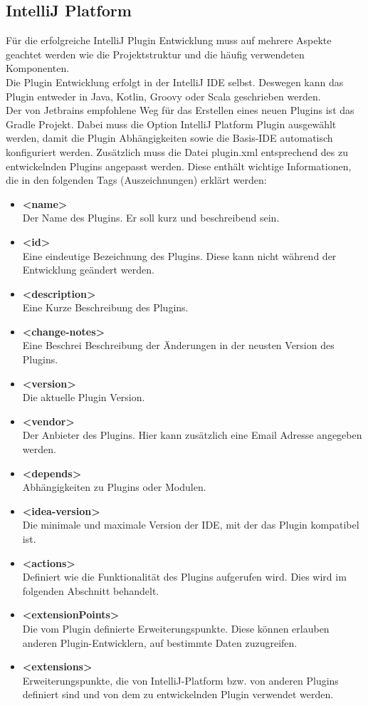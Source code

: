 \subsection{IntelliJ Platform}
	Für die erfolgreiche IntelliJ Plugin Entwicklung muss auf mehrere Aspekte geachtet werden wie die Projektstruktur und die häufig verwendeten Komponenten.\\
	Die Plugin Entwicklung erfolgt in der IntelliJ IDE selbst. Deswegen kann das Plugin entweder in Java, Kotlin, Groovy oder Scala geschrieben werden.\\
	Der von Jetbrains empfohlene Weg für das Erstellen eines neuen Plugins ist das Gradle Projekt. Dabei muss die Option IntelliJ Platform Plugin ausgewählt werden, damit die Plugin Abhängigkeiten sowie die Basis-IDE automatisch konfiguriert werden. Zusätzlich muss die Datei plugin.xml entsprechend des zu entwickelnden Plugins angepasst werden. Diese enthält wichtige Informationen, die in den folgenden Tags (Auszeichnungen) erklärt werden:
	\begin{itemize}
		\item \textbf{<name>} \\
		Der Name des Plugins. Er soll kurz und beschreibend sein.
		\item \textbf{<id>} \\
		Eine eindeutige Bezeichnung des Plugins. Diese kann nicht während der Entwicklung geändert werden.
		\item \textbf{<description>} \\
		Eine Kurze Beschreibung des Plugins.
		\item \textbf{<change-notes>} \\
		Eine Beschrei Beschreibung der Änderungen in der neusten Version des Plugins.
		\item \textbf{<version>} \\
		Die aktuelle Plugin Version.
		\item \textbf{<vendor>} \\
		Der Anbieter des Plugins. Hier kann zusätzlich eine Email Adresse angegeben werden.
		\item \textbf{<depends>} \\
		Abhängigkeiten zu Plugins oder Modulen.
		\item \textbf{<idea-version>} \\
		Die minimale und maximale Version der IDE, mit der das Plugin kompatibel ist.
		\item \textbf{<actions>} \\
		Definiert wie die Funktionalität des Plugins aufgerufen wird. Dies wird im folgenden Abschnitt behandelt.
		\item \textbf{<extensionPoints>} \\
		Die vom Plugin definierte Erweiterungspunkte. Diese können erlauben anderen Plugin-Entwicklern, auf bestimmte Daten zuzugreifen. 
		\item \textbf{<extensions>} \\
		Erweiterungspunkte, die von IntelliJ-Platform bzw. von anderen Plugins definiert sind und von dem zu entwickelnden Plugin verwendet werden.
	\end{itemize}
